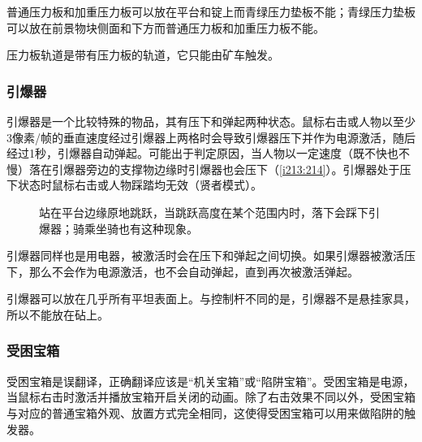 普通压力板和加重压力板可以放在平台和锭上而青绿压力垫板不能；青绿压力垫板可以放在前景物块侧面和下方而普通压力板和加重压力板不能。

压力板轨道是带有压力板的轨道，它只能由矿车触发。

\subsubsection{引爆器}
引爆器是一个比较特殊的物品，其有压下和弹起两种状态。鼠标右击或人物以至少3像素/帧的垂直速度经过引爆器上两格时会导致引爆器压下并作为电源激活，随后经过1秒，引爆器自动弹起。可能出于判定原因，当人物以一定速度（既不快也不慢）落在引爆器旁边的支撑物边缘时引爆器也会压下（\autoref{i213:214}）。引爆器处于压下状态时鼠标右击或人物踩踏均无效（贤者模式）。

\begin{figure}[!h]
\begin{center}
\qquad
{}
\end{center}
\caption{\protect{}站在平台边缘原地跳跃，当跳跃高度在某个范围内时，落下会踩下引爆器；\protect{}骑乘坐骑也有这种现象。}
\label{i213:214}
\end{figure}

引爆器同样也是用电器，被激活时会在压下和弹起之间切换。如果引爆器被激活压下，那么不会作为电源激活，也不会自动弹起，直到再次被激活弹起。

引爆器可以放在几乎所有平坦表面上。与控制杆不同的是，引爆器不是悬挂家具，所以不能放在砧上。

\subsubsection{受困宝箱}
受困宝箱是误翻译，正确翻译应该是“机关宝箱”或“陷阱宝箱”。受困宝箱是电源，当鼠标右击时激活并播放宝箱开启关闭的动画。除了右击效果不同以外，受困宝箱与对应的普通宝箱外观、放置方式完全相同，这使得受困宝箱可以用来做陷阱的触发器。

